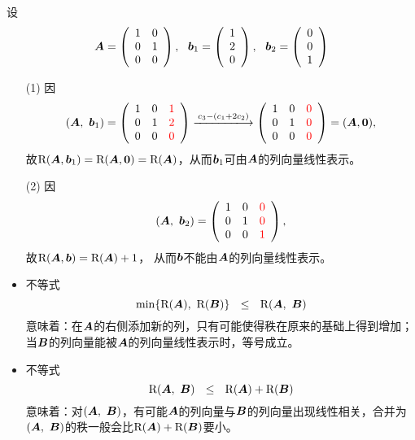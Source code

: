\begin{frame}
  设$$\boldsymbol{A}=\left(
    \begin{array}{cc}
      1&0\\
      0&1\\
      0&0
    \end{array}
  \right),~~
  {\boldsymbol{b}}_1=\left(
    \begin{array}{cc}
      1\\
      2\\
      0
    \end{array}
  \right), ~~
  {\boldsymbol{b}}_2=\left(
    \begin{array}{cc}
      0\\
      0\\
      1
    \end{array}
  \right)  
  $$
  \begin{itemize}
  \item[(1)] 因
    $$
    (\A,~\bb_1) = \left(
      \begin{array}{ccc}
        1&0&\red{1}\\
        0&1&\red{2}\\
        0&0&\red{0}
      \end{array}
    \right) \xlongrightarrow[]{c_3-(c_1+2c_2)}
    \left(
      \begin{array}{ccc}
        1&0&\red{0}\\
        0&1&\red{0}\\
        0&0&\red{0}
      \end{array}
    \right) = (\A, \zero),
    $$
    故$\mathrm{R}(\boldsymbol{A},{\boldsymbol{b}}_1)=\mathrm{R}(\boldsymbol{A},\boldsymbol{0})=\mathrm{R}(\boldsymbol{A})$，从而${\boldsymbol{b}}_1$可由$\boldsymbol{A}$的列向量线性表示。\\[0.1in]  
  \item[(2)] 因
    $$
    (\boldsymbol{A},~{\boldsymbol{b}}_2) = \left(
      \begin{array}{ccc}
        1&0&\textcolor{red}{0}\\
        0&1&\textcolor{red}{0}\\
        0&0&\textcolor{red}{1}
      \end{array}
    \right),
    $$
    故$\mathrm{R}(\boldsymbol{A},{\boldsymbol{b}})=\mathrm{R}(\boldsymbol{A})+1$，
    从而${\boldsymbol{b}}$不能由$\boldsymbol{A}$的列向量线性表示。  
  \end{itemize}
\end{frame}


\begin{frame}
  \begin{zhu*}
    \begin{itemize}
    \item 不等式
      $$
      \min\{\mathrm{R}(\boldsymbol{A}),~\mathrm{R}(\boldsymbol{B})\} ~~\le~~ \mathrm{R}(\boldsymbol{A},~\boldsymbol{B})
      $$
      意味着：在$\boldsymbol{A}$的右侧添加新的列，只有可能使得秩在原来的基础上得到增加；当$\boldsymbol{B}$的列向量能被$\boldsymbol{A}$的列向量线性表示时，等号成立。\\[0.1in]  \pause 
    \item 不等式
      $$
      \mathrm{R}(\boldsymbol{A},~\boldsymbol{B}) ~~\le~~ \mathrm{R}(\boldsymbol{A})+\mathrm{R}(\boldsymbol{B})
      $$
      意味着：对$(\boldsymbol{A},~\boldsymbol{B})$，有可能$\boldsymbol{A}$的列向量与$\boldsymbol{B}$的列向量出现线性相关，合并为$(\boldsymbol{A},~\boldsymbol{B})$的秩一般会比$\mathrm{R}(\boldsymbol{A})+\mathrm{R}(\boldsymbol{B})$要小。
    \end{itemize}
  \end{zhu*}
\end{frame}


